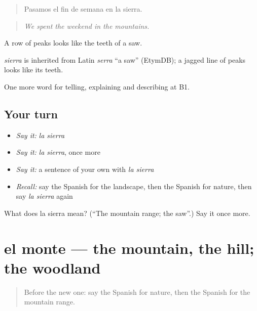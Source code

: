 \begin{quote}
Pasamos el fin de semana en la sierra.
\end{quote}

\begin{quote}
\emph{We spent the weekend in the mountains.}
\end{quote}

A row of peaks looks like the teeth of a saw.

\begin{cousinweb}
\emph{sierra} is inherited from Latin \emph{serra} \textquotedblleft{}a saw\textquotedblright{} (EtymDB); a jagged line of peaks looks like its teeth.
\end{cousinweb}

\begin{grammarlens}[title={What you've built}]
One more word for telling, explaining and describing at B1.
\end{grammarlens}

\subsection*{Your turn}
\begin{itemize}
\raggedright
  \item \emph{Say it:} \emph{la sierra}
  \item \emph{Say it:} \emph{la sierra}, once more
  \item \emph{Say it:} a sentence of your own with \emph{la sierra}
  \item \emph{Recall:} say the Spanish for the landscape, then the Spanish for nature, then say \emph{la sierra} again
\end{itemize}

\begin{tcolorbox}[breakable,colback=teal!4,colframe=teal!35!black,title={Before you move on}]
What does la sierra mean? (\textquotedblleft{}The mountain range; the saw\textquotedblright{}.) Say it once more.
\end{tcolorbox}
\section[el monte]{el monte — the mountain, the hill; the woodland}

\label{lesson:ES-C685-monte}



\begin{quote}
Before the new one: say the Spanish for nature, then the Spanish for the mountain range.
\end{quote}

